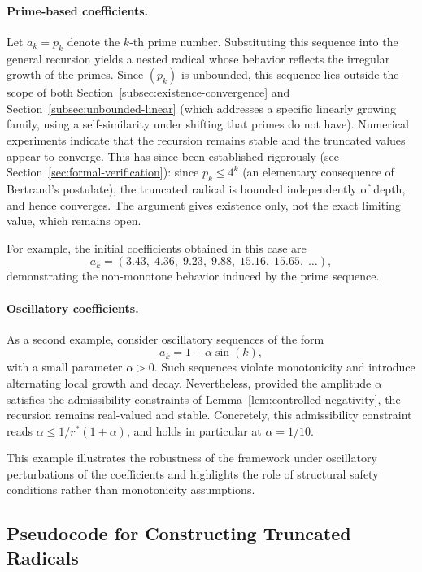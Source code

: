 \documentclass[11pt,a4paper]{amsart}
\theoremstyle{plain}
\theoremstyle{definition}
\theoremstyle{remark}
\begin{document}
\paragraph{Prime-based coefficients.}
Let $a_k = p_k$ denote the $k$-th prime number. Substituting this sequence into the general recursion yields a nested radical whose behavior reflects the irregular growth of the primes. Since $(p_k)$ is unbounded, this sequence lies outside the scope of both Section~\ref{subsec:existence-convergence} and Section~\ref{subsec:unbounded-linear} (which addresses a specific linearly growing family, using a self-similarity under shifting that primes do not have). Numerical experiments indicate that the recursion remains stable and the truncated values appear to converge. This has since been established rigorously (see Section~\ref{sec:formal-verification}): since $p_k \le 4^k$ (an elementary consequence of Bertrand's postulate), the truncated radical is bounded independently of depth, and hence converges. The argument gives existence only, not the exact limiting value, which remains open.

For example, the initial coefficients obtained in this case are
\[
a_k = (3.43,\; 4.36,\; 9.23,\; 9.88,\; 15.16,\; 15.65,\;\ldots),
\]
demonstrating the non-monotone behavior induced by the prime sequence.

\paragraph{Oscillatory coefficients.}
As a second example, consider oscillatory sequences of the form
\[
a_k = 1 + \alpha \sin(k),
\]
with a small parameter $\alpha > 0$. Such sequences violate monotonicity and introduce alternating local growth and decay. Nevertheless, provided the amplitude $\alpha$ satisfies the admissibility constraints of Lemma~\ref{lem:controlled-negativity}, the recursion remains real-valued and stable. Concretely, this admissibility constraint reads $\alpha \le 1/r^\ast(1+\alpha)$, and holds in particular at $\alpha = 1/10$.

This example illustrates the robustness of the framework under oscillatory perturbations of the coefficients and highlights the role of structural safety conditions rather than monotonicity assumptions.

\subsection{Pseudocode for Constructing Truncated Radicals}
\mbox{}
\vspace{1em}
\end{document}
